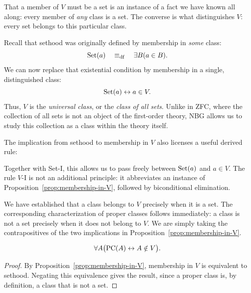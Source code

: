  That a member of \(V\) must be a set is an
instance of a fact we have known all along: every member of \emph{any} class
is a set. The converse is what distinguishes \(V\): every set belongs to
this particular class.

Recall that sethood was originally defined by membership in \emph{some}
class:
\[
\operatorname{Set}(a)\quad\mathrel{\equiv_{\mathrm{df}}}\quad\exists B(a\in B).
\]
We can now replace that existential condition by membership in a single,
distinguished class:
\[
\operatorname{Set}(a) \leftrightarrow a\in V.
\]
Thus, \(V\) is the \emph{universal class}, or the \emph{class of
all sets}. Unlike in ZFC, where the collection of all sets is not an object
of the first-order theory, NBG allows us to study this collection as a
class within the theory itself.

The implication from sethood to membership in \(V\) also licenses a useful
derived rule:

\begin{derivedrule}
\begin{prooftree}
\end{prooftree}
\end{derivedrule}

Together with Set-I, this allows us to pass freely between \(\operatorname{Set}(a)\)
and \(a\in V\). The rule \(V\)-I is not an additional principle: it
abbreviates an instance of Proposition~\ref{prop:membership-in-V}, followed
by biconditional elimination.

 We have established that a class belongs to \(V\) precisely
when it is a set. The corresponding characterization of
proper classes follows immediately: a class is not a set
precisely when it does not belong to \(V\). We are simply
taking the contrapositives of the two implications in
Proposition~\ref{prop:membership-in-V}.

\begin{proposition}
\label{prop:proper-classes-outside-V}
\[
\forall A\bigl(\operatorname{PC}(A)\leftrightarrow A\notin V\bigr).
\]
\end{proposition}

\begin{proof}
By Proposition~\ref{prop:membership-in-V},
membership in \(V\) is equivalent to sethood.
Negating this equivalence gives the result, since
a proper class is, by definition, a class that is
not a set.
\end{proof}

